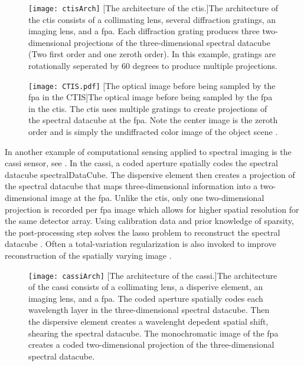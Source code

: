 \begin{figure}
	\texttt{[image: ctisArch]}
	[The architecture of the \acrfull{ctis}.]{The architecture of the \acrfull{ctis} consists of a collimating lens, several diffraction gratings, an imaging lens, and a \acrfull{fpa}. Each diffraction grating produces three two-dimensional projections of the three-dimensional spectral datacube (Two first order and one zeroth order). In this example,  gratings are rotationally seperated by 60 degrees to produce multiple projections. \cite{descour1995computed}}
	\label{fig:ctisArch}
\end{figure}

\begin{figure}
	\centering
	\texttt{[image: CTIS.pdf]}
	[The optical image before being sampled by the \gls{fpa} in the CTIS]{The optical image before being sampled by the \gls{fpa} in the \gls{ctis}. The \gls{ctis} uses multiple gratings to create projections of the spectral datacube at the \gls{fpa}. Note the center image is the zeroth order and is simply the undiffracted color image of the object scene \cite{descour1995computed}.}
	\label{fig:CTIS}
\end{figure}

In another example of computational sensing applied to spectral imaging is the \acrfull{cassi} sensor, see . In the \gls{cassi}, a coded aperture spatially codes the spectral datacube \gls{spectralDataCube}. The dispersive element then creates a projection of the spectral datacube that maps three-dimensional information into a two-dimensional image at the \gls{fpa}. Unlike the \gls{ctis}, only one two-dimensional projection is recorded per \gls{fpa} image which allows for higher spatial resolution for the same detector array. Using calibration data and prior knowledge of sparsity, the post-processing step solves the \gls{lasso} problem to reconstruct the spectral datacube \cite{wagadarikar2008single, arce2014compressive}. Often a total-variation regularization is also invoked to improve reconstruction of the spatially varying image \cite{wagadarikar2008spectral, bioucas2007new}.


\begin{figure}
	\texttt{[image: cassiArch]}
	[The architecture of the \acrfull{cassi}.]{The architecture of the \acrfull{cassi} consists of a collimating lens, a disperive element, an imaging lens, and a \acrfull{fpa}. The coded aperture spatially codes each wavelength layer in the three-dimensional spectral datacube. Then the dispersive element creates a wavelenght depedent spatial shift, shearing the spectral datacube. The monochromatic image of the \gls{fpa} creates a coded two-dimensional projection of the three-dimensional spectral datacube.}
	\label{fig:cassiArch}
\end{figure}


